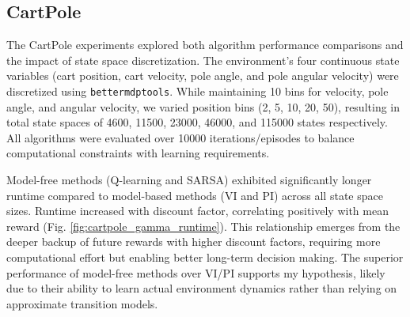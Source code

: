 \documentclass[conference]{IEEEtran}
\begin{document}

\subsection{CartPole}
The CartPole experiments explored both algorithm performance comparisons and the impact of state space discretization. The environment's four continuous state variables (cart position, cart velocity, pole angle, and pole angular velocity) were discretized using \texttt{bettermdptools}. While maintaining 10 bins for velocity, pole angle, and angular velocity, we varied position bins (2, 5, 10, 20, 50), resulting in total state spaces of 4600, 11500, 23000, 46000, and 115000 states respectively. All algorithms were evaluated over 10000 iterations/episodes to balance computational constraints with learning requirements.

Model-free methods (Q-learning and SARSA) exhibited significantly longer runtime compared to model-based methods (VI and PI) across all state space sizes. Runtime increased with discount factor, correlating positively with mean reward (Fig. \ref{fig:cartpole_gamma_runtime}). This relationship emerges from the deeper backup of future rewards with higher discount factors, requiring more computational effort but enabling better long-term decision making. The superior performance of model-free methods over VI/PI supports my hypothesis, likely due to their ability to learn actual environment dynamics rather than relying on approximate transition models.
\end{document}
